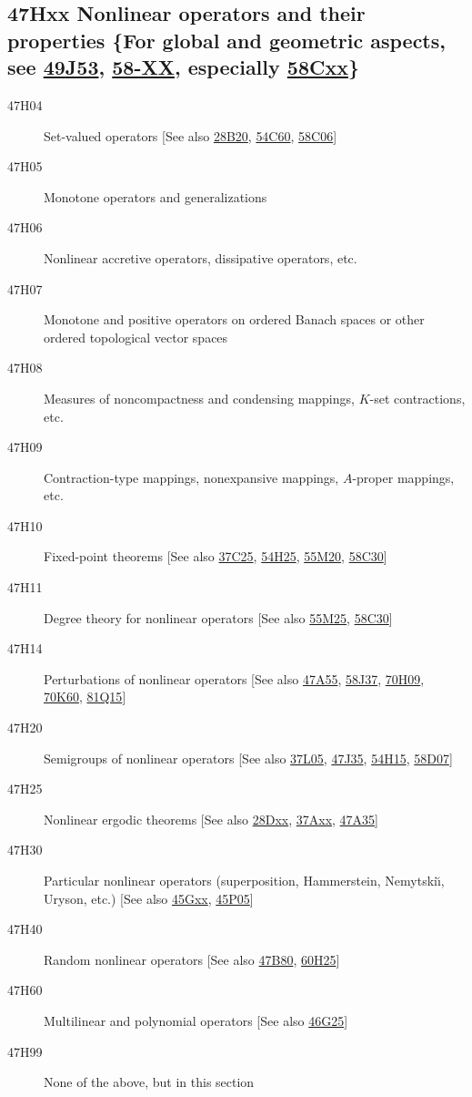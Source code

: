 \subsection*{47Hxx  Nonlinear operators and their properties \{For global and geometric aspects, see \hyperref[49J53]{49J53}, \hyperref[58-XX]{58-XX}, especially \hyperref[58Cxx]{58Cxx}\} }\label{47Hxx}
\begin{description}  
\item [47H04]\label{47H04} Set-valued operators [See also \hyperref[28B20]{28B20}, \hyperref[54C60]{54C60}, \hyperref[58C06]{58C06}]
\item [47H05]\label{47H05} Monotone operators and generalizations
\item [47H06]\label{47H06} Nonlinear accretive operators, dissipative operators, etc.
\item [47H07]\label{47H07} Monotone and positive operators on ordered Banach spaces or other ordered topological vector spaces
\item [47H08]\label{47H08} Measures of noncompactness and condensing mappings, $K$-set contractions, etc.
\item [47H09]\label{47H09} Contraction-type mappings, nonexpansive mappings, $A$-proper mappings, etc.
\item [47H10]\label{47H10} Fixed-point theorems [See also \hyperref[37C25]{37C25}, \hyperref[54H25]{54H25}, \hyperref[55M20]{55M20}, \hyperref[58C30]{58C30}]
\item [47H11]\label{47H11} Degree theory for nonlinear operators [See also \hyperref[55M25]{55M25}, \hyperref[58C30]{58C30}]
\item [47H14]\label{47H14} Perturbations of nonlinear operators [See also \hyperref[47A55]{47A55}, \hyperref[58J37]{58J37}, \hyperref[70H09]{70H09}, \hyperref[70K60]{70K60}, \hyperref[81Q15]{81Q15}]
\item [47H20]\label{47H20} Semigroups of nonlinear operators [See also \hyperref[37L05]{37L05}, \hyperref[47J35]{47J35}, \hyperref[54H15]{54H15}, \hyperref[58D07]{58D07}]
\item [47H25]\label{47H25} Nonlinear ergodic theorems [See also \hyperref[28Dxx]{28Dxx}, \hyperref[37Axx]{37Axx}, \hyperref[47A35]{47A35}]
\item [47H30]\label{47H30} Particular nonlinear operators (superposition, Hammerstein, Nemytski\u{\i}, Uryson, etc.) [See also \hyperref[45Gxx]{45Gxx}, \hyperref[45P05]{45P05}]
\item [47H40]\label{47H40} Random nonlinear operators [See also \hyperref[47B80]{47B80}, \hyperref[60H25]{60H25}]
\item [47H60]\label{47H60} Multilinear and polynomial operators [See also \hyperref[46G25]{46G25}]
\item [47H99]\label{47H99} None of the above, but in this section
\end{description}
